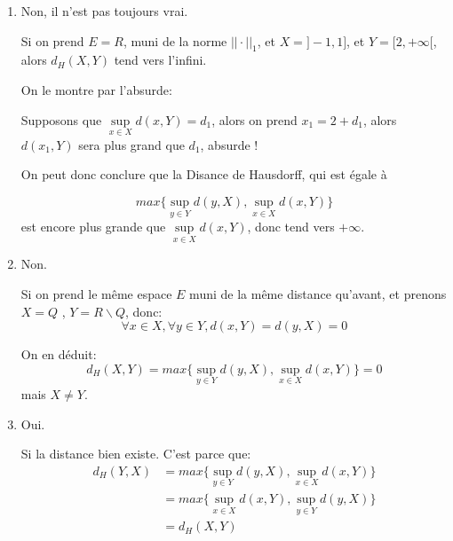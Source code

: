 \documentclass{article}
\begin{document}
\begin{enumerate}
    \item Non, il n'est pas toujours vrai. 

        Si on prend $E=R$, muni de la norme $||\cdot||_{1}$, et $X = ]-1, 1]$, et $Y = [2,+\infty[$, alors $d_{H}(X,Y)$ tend vers l'infini.
\par
On le montre par l'absurde:
\par
Supposons que $ \mathop{sup}\limits_{x\in X} d(x,Y) = d_{1}$, alors on prend $x_{1} = 2+d_{1}$, alors $d(x_{1},Y)$ sera plus grand que $d_{1}$, absurde !
\par
On peut donc conclure que la Disance de Hausdorff, qui est égale à

$$max\{\mathop{sup}\limits_{y\in Y} d(y,X),\mathop{sup}\limits_{x\in X} d(x,Y)\}$$ est encore plus grande que $ \mathop{sup}\limits_{x\in X} d(x,Y)$, donc tend vers $+\infty$.

\item Non.

    Si on prend le même espace $E$ muni de la même distance qu'avant, et prenons $X = Q$ , $Y = R\backslash Q$, donc: $${\forall}x \in X, {\forall}y \in Y, d(x,Y) =d(y,X)=0$$
    
On en déduit: $$d_{H}(X,Y) = max\{\mathop{sup}\limits_{y\in Y} d(y,X),\mathop{sup}\limits_{x\in X} d(x,Y)\} = 0 $$
mais $X\neq Y$. 

\item Oui.

Si la distance bien existe. C'est parce que:
\begin{equation}
\begin{aligned}
d_{H}(Y,X) &= max\{\mathop{sup}\limits_{y\in Y} d(y,X),\mathop{sup}\limits_{x\in X} d(x,Y)\}\\
&=  max\{\mathop{sup}\limits_{x\in X} d(x,Y),\mathop{sup}\limits_{y\in Y} d(y,X)\}\\
&= d_{H}(X,Y)
\end{aligned}
\end{equation}


\end{enumerate}
\end{document}
